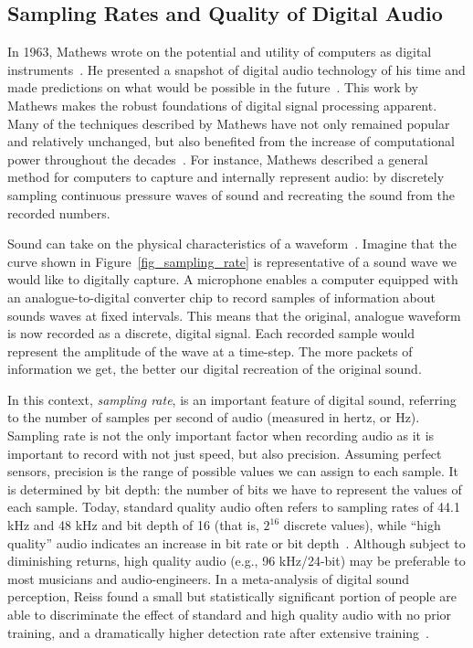 \documentclass[\main/thesis.tex]{subfiles}
\begin{document}
\subsection{Sampling Rates and Quality of Digital Audio}
\label{sec_sampling_rates}
In 1963, Mathews wrote on the potential and utility of computers as digital instruments~\cite{mathews1963digital}. He presented a snapshot of digital audio technology of his time and made predictions on what would be possible in the future~\cite{mathews1963digital}. This work by Mathews makes the robust foundations of digital signal processing apparent. Many of the techniques described by Mathews have not only remained popular and relatively unchanged, but also benefited from the increase of computational power throughout the decades~\cite{mack2011fifty,smith1991viewpoints}. For instance, Mathews described a general method for computers to capture and internally represent audio: by discretely sampling continuous pressure waves of sound and recreating the sound from the recorded numbers. 

Sound can take on the physical characteristics of a waveform~\cite{cook1999chap4}. Imagine that the curve shown in Figure~\ref{fig_sampling_rate} is representative of a sound wave we would like to digitally capture. A microphone enables a computer equipped with an analogue-to-digital converter chip to record samples of information about sounds waves at fixed intervals. This means that the original, analogue waveform is now recorded as a discrete, digital signal. Each recorded sample would represent the amplitude of the wave at a time-step. The more packets of information we get, the better our digital recreation of the original sound.

In this context, \textit{sampling rate}, is an important feature of digital sound, referring to the number of samples per second of audio (measured in hertz, or Hz). Sampling rate is not the only important factor when recording audio as it is important to record with not just speed, but also precision. Assuming perfect sensors, precision is the range of possible values we can assign to each sample. It is determined by bit depth: the number of bits we have to represent the values of each sample.  Today, standard quality audio often refers to sampling rates of 44.1 kHz and 48 kHz and bit depth of 16 (that is, $2^{16}$ discrete values), while \enquote{high quality} audio indicates an increase in bit rate or bit depth~\cite{reiss2016meta}. Although subject to diminishing returns, high quality audio (e.g., 96 kHz/24-bit) may be preferable to most musicians and audio-engineers. In a meta-analysis of digital sound perception, Reiss found a small but statistically significant portion of people are able to discriminate the effect of standard and high quality audio with no prior training, and a dramatically higher detection rate after extensive training~\cite{reiss2016meta}. 
\end{document}
